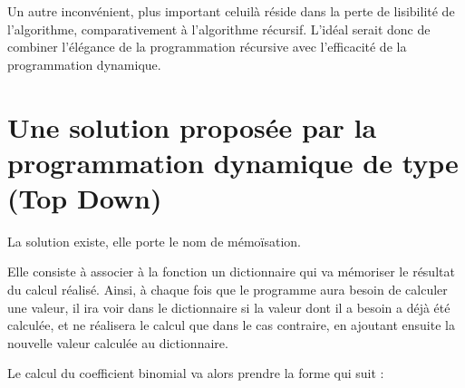 \documentclass[letterpaper,10pt,english]{jupyterBook}
\begin{document}
\sphinxAtStartPar
Un autre inconvénient, plus important celui\sphinxhyphen{}là réside dans la perte de lisibilité de l’algorithme, comparativement à l’algorithme récursif. L’idéal serait donc de combiner l’élégance de la programmation récursive avec l’efficacité de la programmation dynamique.


\section{Une solution proposée par la programmation dynamique de type (Top Down)}
\label{\detokenize{notebooks/dynamicProgramming/ProgrammationDynamique:une-solution-proposee-par-la-programmation-dynamique-de-type-top-down}}
\sphinxAtStartPar
La solution existe, elle porte le nom de mémoïsation.

\sphinxAtStartPar
Elle consiste à associer à la fonction un dictionnaire qui va mémoriser le résultat du calcul réalisé. Ainsi, à chaque fois que le programme aura besoin de calculer une valeur, il ira voir dans le dictionnaire si la valeur dont il a besoin a déjà été calculée, et ne réalisera le calcul que dans le cas contraire, en ajoutant ensuite la nouvelle valeur calculée au dictionnaire.

\sphinxAtStartPar
Le calcul du coefficient binomial va alors prendre la forme qui suit :
\begin{sphinxVerbatimInput}

\begin{sphinxVerbatim}[commandchars=\\\{\}]
  
   
         
               
              
                        
        \PYG{p}{[} \PYG{p}{]}  
     \PYG{p}{[} \PYG{p}{]}
\end{sphinxVerbatim}
\end{sphinxVerbatimInput}
\end{document}

